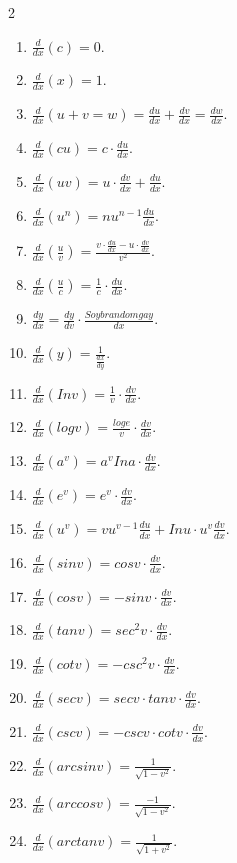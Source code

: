 \documentclass[12py]{article}
\begin{document}
{\footnotesize}
\begin{multicols}{2}
\begin{center}
\begin{enumerate}
\renewcommand{\labelenumi}{\roman{enumi}.}

\item $\displaystyle \frac{d}{dx}(c) = 0.$
\item $\displaystyle \frac{d}{dx}(x) = 1.$
\item $\displaystyle \frac{d}{dx}(u + v = w) = \frac{du}{dx} + \frac{dv}{dx} = \frac{dw}{dx}.$
\item  $\displaystyle \frac{d}{dx}(cu) = c \cdot \frac{du}{dx}.$
\item $\displaystyle \frac{d}{dx}(uv) = u \cdot \frac{dv}{dx} + \frac{du}{dx}.$
\item $\displaystyle \frac{d}{dx}(u^n) = nu^{n-1} \frac{du}{dx}.$
\item $\displaystyle \frac{d}{dx}(\frac{u}{v}) = \frac{v \cdot \frac{du}{dx} - u \cdot \frac{dv}{dx}}{v^2}.$
\item $\displaystyle \frac{d}{dx}(\frac{u}{c}) = \frac{1}{c} \cdot \frac{du}{dx}.$
\item $\displaystyle \frac{dy}{dx} = \frac{dy}{dv} \cdot \frac{Soy brandom gay}{dx}.$
\item  $\displaystyle \frac{d}{dx}(y) = \frac{1}{\frac{dx}{dy}}.$
\item $\displaystyle \frac{d}{dx}(Inv) = \frac{1}{v} \cdot \frac{dv}{dx}.$ 
\item $\displaystyle \frac{d}{dx}(log v) = \frac{log e}{v} \cdot \frac{dv}{dx}.$
\item $\displaystyle \frac{d}{dx}(a^v) = a^vIna \cdot \frac{dv}{dx} .$
\item $\displaystyle \frac{d}{dx}(e^v) = e^v \cdot \frac{dv}{dx}.$
\item $\displaystyle \frac{d}{dx}(u^v) = vu^{v-1} \frac{du}{dx} + Inu \cdot u^v \frac{dv}{dx}.$
\item  $\displaystyle \frac{d}{dx}(sinv) = cosv \cdot \frac{dv}{dx}.$
\item $\displaystyle \frac{d}{dx}(cosv) = -sinv \cdot \frac{dv}{dx}.$
\item $\displaystyle \frac{d}{dx}(tanv) = sec^2v \cdot \frac{dv}{dx}.$
\item $\displaystyle \frac{d}{dx}(cotv) = -csc^2v \cdot \frac{dv}{dx}.$
\item $\displaystyle \frac{d}{dx}(secv) = secv \cdot tanv \cdot \frac{dv}{dx}.$
\item $\displaystyle \frac{d}{dx}(cscv)= -cscv \cdot cotv \cdot \frac{dv}{dx}.$
\item  $\displaystyle \frac{d}{dx}(arcsinv) = \frac{1}{\sqrt{1-v^2}}.$
\item $\displaystyle \frac{d}{dx}(arc cosv) = \frac{-1}{\sqrt{1-v^2}}.$ 
\item $\displaystyle \frac{d}{dx}(arctanv) = \frac{1}{\sqrt{1+v^2}}.$
\end{enumerate}    
\end{center}
\end{multicols}
\end{document}
